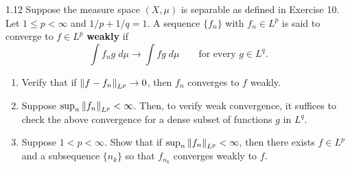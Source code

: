 \documentclass{article}
\begin{document}
\begin{prb}{1.12}
	Suppose the measure space $(X, \mu)$ is separable as defined in Exercise 10. Let $1 \leq p < \infty$ and $1/p + 1/q = 1$. A sequence $\{f_{n}\}$ with $f_{n} \in L^p$ is said to converge to $f \in L^p$ \textbf{weakly} if 
	\begin{equation*}
		\int f_{n}g\;d\mu \to \int fg\;d\mu \qquad \text{for every $g \in L^q$}. 
	\end{equation*}
	\begin{enumerate}[itemsep =-2pt,label = (\alph{*})]
		\item Verify that if $\left\Vert f - f_{n} \right\Vert_{L^p} \to 0$, then $f_{n}$ converges to $f$ weakly. 
		\item Suppose $\sup_{n}\left\Vert f_{n} \right\Vert_{L^p} < \infty$. Then, to verify weak convergence, it suffices to check the above convergence for a dense subset of functions $g$ in $L^q$. 
		\item Suppose $1 < p < \infty$. Show that if $\sup_{n}\left\Vert f_{n} \right\Vert_{L^p} <\infty$, then there exists $f \in L^p$ and a subsequence $\{n_{k}\}$ so that $f_{n_{k}}$ converges weakly to $f$. 
	\end{enumerate}
\end{prb}
\end{document}
